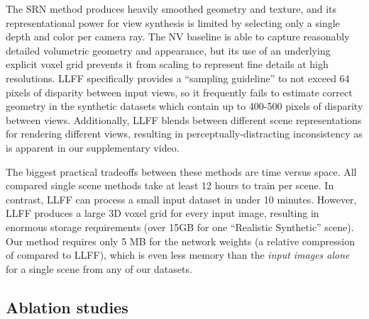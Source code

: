 \documentclass[runningheads]{llncs}
\begin{document}
The SRN method produces heavily smoothed geometry and texture, and its representational power for view synthesis is limited by selecting only a single depth and color per camera ray. The NV baseline is able to capture reasonably detailed volumetric geometry and appearance, but its use of an underlying explicit  voxel grid prevents it from scaling to represent fine details at high resolutions. LLFF specifically provides a ``sampling guideline'' to not exceed 64 pixels of disparity between input views, so it frequently fails to estimate correct geometry in the synthetic datasets which contain up to 400-500 pixels of disparity between views. Additionally, LLFF blends between different scene representations for rendering different views, resulting in perceptually-distracting inconsistency as is apparent in our supplementary video. 

The biggest practical tradeoffs between these methods are time versus space. All compared single scene methods take at least 12 hours to train per scene. In contrast, LLFF can process a small input dataset in under 10 minutes. However, LLFF produces a large 3D voxel grid for every input image, resulting in enormous storage requirements (over 15GB for one ``Realistic Synthetic'' scene). Our method requires only 5 MB for the network weights (a relative compression of  compared to LLFF), which is even less memory than the \emph{input images alone} for a single scene from any of our datasets.

\subsection{Ablation studies}
\label{sec:ablations}
\end{document}
